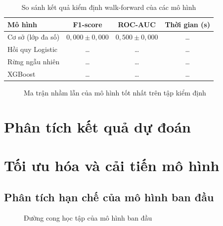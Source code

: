 \documentclass[12pt,a4paper,oneside]{report}
\begin{document}
\begin{table}[H]
  \centering
  \caption{So sánh kết quả kiểm định walk-forward của các mô hình}
  \label{tab:sosanh}
  \begin{tabular}{lccc}
    \toprule
    \textbf{Mô hình} & \textbf{F1-score} & \textbf{ROC-AUC} & \textbf{Thời gian (s)} \\
    \midrule
    Cơ sở (lớp đa số)   & $0{,}000 \pm 0{,}000$ & $0{,}500 \pm 0{,}000$ & \dots \\
    Hồi quy Logistic    & \dots & \dots & \dots \\
    Rừng ngẫu nhiên     & \dots & \dots & \dots \\
    XGBoost             & \dots & \dots & \dots \\
    \bottomrule
  \end{tabular}
\end{table}

\begin{figure}[H]
  \centering
  \caption{Ma trận nhầm lẫn của mô hình tốt nhất trên tập kiểm định}
  \label{fig:nhamlan}
\end{figure}

\section{Phân tích kết quả dự đoán}

\section{Tối ưu hóa và cải tiến mô hình}
\label{sec:caitien}

\subsection{Phân tích hạn chế của mô hình ban đầu}

\begin{figure}[H]
  \centering
  \caption{Đường cong học tập của mô hình ban đầu}
  \label{fig:learningcurve}
\end{figure}
\end{document}
